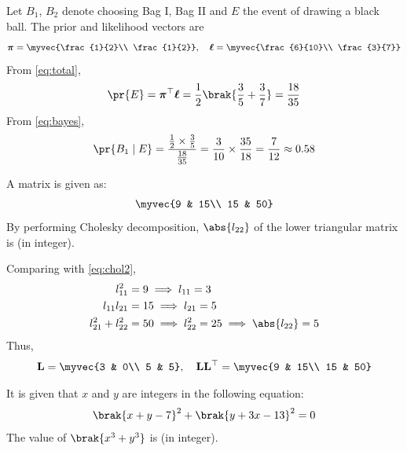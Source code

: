 \begin{enumerate}[label=1.2.\arabic*,leftmargin=*,labelsep=0.8em,itemsep=2ex]
\solution Let $B_1$, $B_2$ denote choosing Bag I, Bag II and $E$ the event of drawing a black ball. The prior and likelihood vectors are
\begin{align}
\boldsymbol{\pi} = \myvec{\frac{1}{2}\\ \frac{1}{2}},\quad \boldsymbol{\ell} = \myvec{\frac{6}{10}\\ \frac{3}{7}}
\end{align}
From \eqref{eq:total},
\begin{align}
\pr{E} = \boldsymbol{\pi}^\top\boldsymbol{\ell} = \frac{1}{2}\brak{\frac{3}{5} + \frac{3}{7}} = \frac{18}{35}
\end{align}
From \eqref{eq:bayes},
\begin{align}
\pr{B_1\mid E} = \frac{\frac{1}{2}\times\frac{3}{5}}{\frac{18}{35}} = \frac{3}{10}\times\frac{35}{18} = \frac{7}{12} \approx 0.58
\end{align}

\problem A matrix is given as:
\begin{align}
\myvec{9 & 15\\ 15 & 50}
\end{align}
By performing Cholesky decomposition, $\abs{l_{22}}$ of the lower triangular matrix is \underline{\hspace{2cm}} (in integer). \gate

\solution Comparing with \eqref{eq:chol2},
\begin{align}
l_{11}^2 &= 9 \implies l_{11} = 3\\
l_{11}l_{21} &= 15 \implies l_{21} = 5\\
l_{21}^2 + l_{22}^2 &= 50 \implies l_{22}^2 = 25 \implies \abs{l_{22}} = 5
\end{align}
Thus,
\begin{align}
\mathbf{L} = \myvec{3 & 0\\ 5 & 5},\quad \mathbf{L}\mathbf{L}^\top = \myvec{9 & 15\\ 15 & 50}
\end{align}

\problem It is given that $x$ and $y$ are integers in the following equation:
\begin{align}
\brak{x + y - 7}^2 + \brak{y + 3x - 13}^2 = 0
\end{align}
The value of $\brak{x^3 + y^3}$ is \underline{\hspace{2cm}} (in integer). \gate


\end{enumerate}
